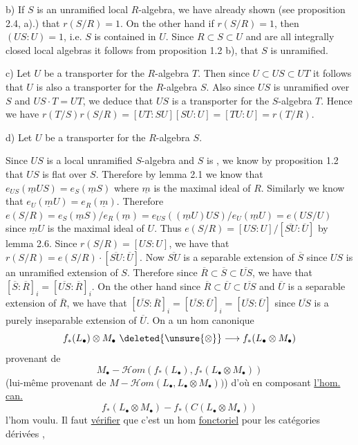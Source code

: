 b) If $S$ is an unramified local $R$-algebra, we have already shown (see
proposition 2.4, a).) that $r(S/R)=1$. On the other hand if $r(S/R)=1$,
then $(US:U)=1$, i.e. $S$ is contained in $U$. Since $R\subset S\subset U$ and are all
integrally closed local algebras it follows from proposition 1.2 b), that
$S$ is unramified.

c) Let $U$ be a transporter for the $R$-algebra $T$. Then since
$U\subset US\subset UT$ it follows that $U$ is also a transporter for the $R$-algebra $S$.
Also since $US$ is unramified over $S$ and $US\cdot T=UT$, we deduce that $US$ is a
transporter for the $S$-algebra $T$. Hence we have $r(T/S)r(S/R)=
[UT:SU][SU:U]=[TU:U]=r(T/R)$.

d) Let $U$ be a transporter for the $R$-algebra $S$.

Since $US$ is a local unramified $S$-algebra and $S$ is ,  we know by
proposition 1.2 that $US$ is flat over $S$. Therefore by lemma 2.1 we know
that $e_{US}(\underline m US)=e_S(\underline m S)$ where $\underline m$ is the maximal ideal of $R$. Similarly we
know that $e_U(\underline m U)=e_R(\underline m)$. Therefore $e(S/R)=e_S(\underline m S)/e_R(\underline m)=
e_{US}((\underline m U)US)/e_U(\underline m U)=e(US/U)$ since $\underline m U$ is the maximal ideal of $U$. Thus
$e(S/R)=[US:U]/[\overline{SU}:\overline U]$ by lemma 2.6. Since $r(S/R)=[US:U]$, we have
that $r(S/R)=e(S/R)\cdot[\overline{SU}:\overline U]$. Now $\overline{SU}$ is a separable extension of $\overline S$ since
$US$ is an unramified extension of $S$. Therefore since $\overline R\subset\overline S\subset\overline{US}$, we have
that $[\overline S:\overline R]_i=[\overline{US}:\overline R]_i$. On the other hand since $\overline R\subset\overline U\subset\overline{US}$ and $\overline U$ is a
separable extension of $\overline R$, we have that $[\overline{US}:\overline R]_i=[\overline{US}:\overline U]_i=[\overline{US}:\overline U]$
since $\overline{US}$ is a purely inseparable extension of $\overline U$.
On a un hom canonique
\[
f_*(L_\bullet)\otimes M_\bullet\ \deleted{\unsure{\otimes}}\longrightarrow f_*(L_\bullet\otimes M_\bullet)
\]
provenant de
\[
M_\bullet-\mathcal Hom(f_*(L_\bullet),f_*(L_\bullet\otimes M_\bullet))
\]
(lui-même provenant de $M-\mathcal Hom(L_\bullet,L_\bullet\otimes M_\bullet))$)
d'où en composant  \uline{l'hom. can.}
\[
f_*(L_\bullet\otimes M_\bullet)-f_*(C(L_\bullet\otimes M_\bullet))
\]
l'hom voulu. Il faut \uline{vérifier} que
c'est un hom \uline{fonctoriel} pour les catégories
dérivées , 

